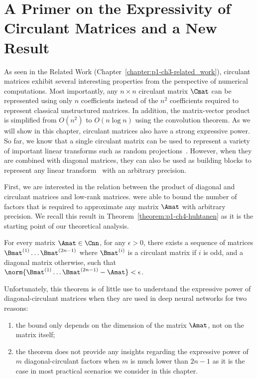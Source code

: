\section{A Primer on the Expressivity of Circulant Matrices and a New Result}
\label{section:p1-ch4-a_primer_on_circulant_matrices_and_a_new_result}

As seen in the Related Work (Chapter~\ref{chapter:p1-ch3-related_work}), circulant matrices exhibit several interesting properties from the perspective of numerical computations.
Most importantly, any $n \times n$ circulant matrix $\Cmat$ can be represented using only $n$ coefficients instead of the $n^2$ coefficients required to represent classical unstructured matrices.
In addition, the matrix-vector product is simplified from $O(n^2)$ to $O(n \log n)$ using the  convolution theorem.
As we will show in this chapter, circulant matrices also have a strong expressive power.
So far, we know that a single circulant matrix can be used to represent a variety of important linear transforms such as random projections~\cite{hinrichs2011johnson}. 
However, when they are combined with diagonal matrices, they can also be used as building blocks to represent any linear transform~\cite{schmid2000decomposing,huhtanen2015factoring} with an arbitrary precision.

First, we are interested in the relation between the product of diagonal and circulant matrices and low-rank matrices.
\citet{huhtanen2015factoring} were able to bound the number of factors that is required to approximate any matrix $\Amat$ with arbitrary precision.
We recall this result in Theorem~\ref{theorem:p1-ch4-huhtanen} as it is the starting point of our theoretical analysis.

\begin{theorem}
  For every matrix $\Amat \in \Cnn$, for any $\epsilon > 0$, there exists a sequence of matrices $\Bmat^{(1)} \ldots \Bmat^{(2n-1)}$ where $\Bmat^{(i)}$ is a circulant matrix if $i$ is odd, and a diagonal matrix otherwise, such that $\norm{\Bmat^{(1)} \ldots \Bmat^{(2n-1)} - \Amat} < \epsilon$.
  \label{theorem:p1-ch4-huhtanen}
\end{theorem}

\noindent
Unfortunately, this theorem is of little use to understand the expressive power of diagonal-circulant matrices when they are used in deep neural networks for two reasons:
\begin{enumerate}
  \item the bound only depends on the dimension of the matrix $\Amat$, not on the matrix itself;
  \item the theorem does not provide any insights regarding the expressive power of $m$ diagonal-circulant factors when $m$ is much lower than $2n - 1$ as it is the case in most practical scenarios we consider in this chapter. 
\end{enumerate}

